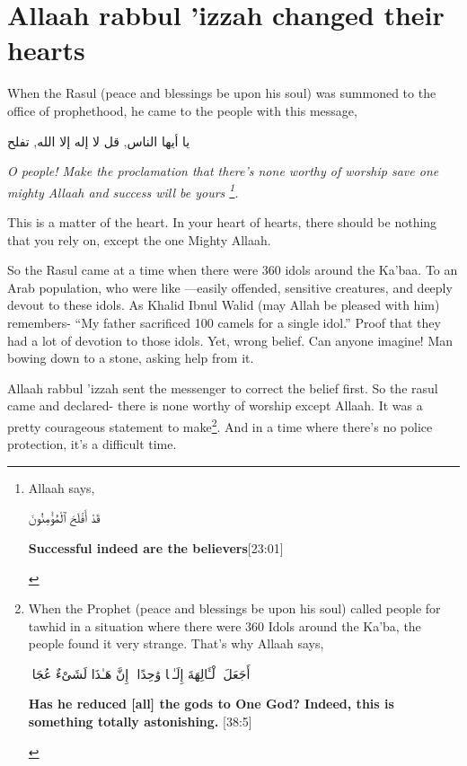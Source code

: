 {\section*{Allaah rabbul 'izzah changed their hearts}
When the Rasul (peace and blessings be upon his soul) was summoned to the office of prophethood, he came to the people with this message,
\begin{center}
    \begin{RLtext}
        يا أيها الناس, قل لا إله إلا الله, تفلح
    \end{RLtext}
\end{center}
\textit{O people! Make the proclamation that there’s none worthy of worship save one mighty Allaah and success will be yours \footnote{Allaah says,
\begin{center}
    \begin{RLtext}
        قَدْ أَفْلَحَ ٱلْمُؤْمِنُونَ 
    \end{RLtext}
    \textbf{Successful indeed are the believers}[23:01]
\end{center}
}.}

This is a matter of the heart. In your heart of hearts, there should be nothing that you rely on, except the one Mighty Allaah. 

So the Rasul came at a time when there were 360 idols around the Ka’baa. To an Arab population, who were like ---easily offended, sensitive creatures, and deeply devout to these idols. As Khalid Ibnul Walid (may Allah be pleased with him) remembers- ``My father sacrificed 100 camels for a single idol.'' Proof that they had a lot of devotion to those idols. Yet, wrong belief. Can anyone imagine! Man bowing down to a stone, asking help from it.

Allaah rabbul 'izzah sent the messenger to correct the belief first. So the rasul came and declared- there is none worthy of worship except Allaah. It was a pretty courageous statement to make\footnote{When the Prophet (peace and blessings be upon his soul) called people for tawhid in a situation where there were 360 Idols around the Ka’ba, the people found it very strange. That’s why Allaah says, 
\begin{center}
    \begin{RLtext}
        أَجَعَلَ ٱلْـَٔالِهَةَ إِلَـٰهًۭا وَٰحِدًا ۖ إِنَّ هَـٰذَا لَشَىْءٌ عُجَابٌۭ
    \end{RLtext}
    \textbf{Has he reduced [all] the gods to One God? Indeed, this is something totally astonishing.} [38:5]
\end{center}
}. And in a time where there’s no police protection, it's a difficult time.

}
